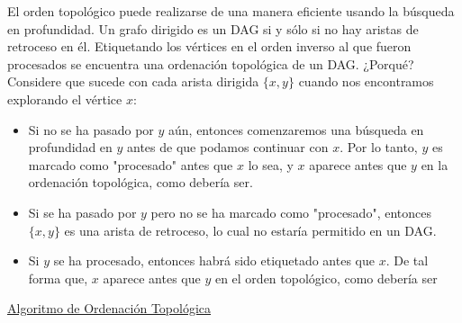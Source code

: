 El orden topológico puede realizarse de una manera eficiente usando la búsqueda en profundidad. Un grafo dirigido es un DAG si y sólo si no hay aristas de retroceso en él. Etiquetando los vértices en el orden inverso al que fueron procesados se encuentra una ordenación topológica de un DAG. ¿Porqué? Considere que sucede con cada arista dirigida $\{x,y\}$ cuando nos encontramos explorando el vértice $x$:\\

\begin{itemize}
\item Si no se ha pasado por $y$ aún, entonces comenzaremos una búsqueda en profundidad en $y$ antes de que podamos continuar con $x$. Por lo tanto, $y$ es marcado como "procesado" antes que $x$ lo sea, y $x$ aparece antes que $y$ en la ordenación topológica, como debería ser.
\item Si se ha pasado por $y$ pero no se ha marcado como "procesado", entonces $\{x,y\}$ es una arista de retroceso, lo cual no estaría permitido en un DAG.
\item Si $y$ se ha procesado, entonces habrá sido etiquetado antes que $x$. De tal forma que, $x$ aparece antes que $y$ en el orden topológico, como debería ser
\end{itemize}

\underline{Algoritmo de Ordenación Topológica}\\

